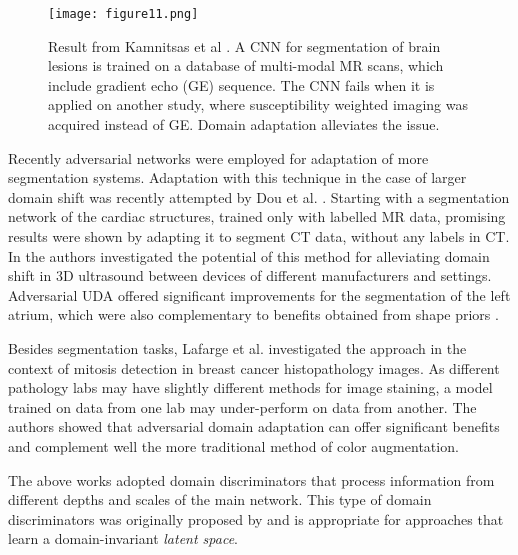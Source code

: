 \documentclass{article}
\begin{document}
\begin{figure}[tp]
\centering
\texttt{[image: figure11.png]}
\caption{Result from Kamnitsas et al \cite{kamnitsas2017unsupervised}. A CNN for segmentation of brain lesions is trained on a database of multi-modal MR scans, which include gradient echo (GE) sequence. The CNN fails when it is applied on another study, where susceptibility weighted imaging was acquired instead of GE. Domain adaptation alleviates the issue.}
\label{fig:uda_visuals}
\end{figure}

Recently adversarial networks were employed for adaptation of more segmentation systems. Adaptation with this technique in the case of larger domain shift was recently attempted by Dou et al. \cite{dou2018unsupervised}.
Starting with a segmentation network of the cardiac structures, trained only with labelled MR data, promising results were shown by adapting it to segment CT data, without any labels in CT. In \cite{degel2018domain} the authors investigated the potential of this method for alleviating domain shift in 3D ultrasound between devices of different manufacturers and settings. Adversarial UDA offered significant improvements for the segmentation of the left atrium, which were also complementary to benefits obtained from shape priors \cite{oktay2018anatomically}.

Besides segmentation tasks, Lafarge et al. \cite{lafarge2017domain} investigated the approach in the context of mitosis detection in breast cancer histopathology images. 
As different pathology labs may have slightly different methods for image staining, a model trained on data from one lab may under-perform on data from another. The authors showed that adversarial domain adaptation can offer significant benefits and complement well the more traditional method of color augmentation.

The above works \cite{lafarge2017domain,dou2018unsupervised,degel2018domain} adopted domain discriminators that process information from different depths and scales of the main network. 
This type of domain discriminators was originally proposed by \cite{kamnitsas2017unsupervised} and is appropriate for approaches that learn a domain-invariant \emph{latent space}.

\end{document}
